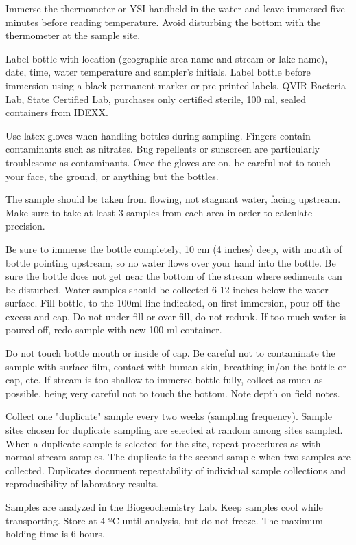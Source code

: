 \documentclass[12pt]{../SOP4_alpha}\usepackage[]{graphicx}\usepackage[]{xcolor}
\begin{document}
\NP Immerse the thermometer or YSI handheld in the water and leave immersed
five minutes before reading temperature. Avoid disturbing the bottom with
the thermometer at the sample site.

\NP Label bottle with location (geographic area name and stream or lake name),
date, time, water temperature and sampler's initials. Label bottle before
immersion using a black permanent marker or pre-printed labels. QVIR
Bacteria Lab, State Certified Lab, purchases only certified sterile, 100 ml,
sealed containers from IDEXX.

\NP Use latex gloves when handling bottles during sampling. Fingers contain
contaminants such as nitrates. Bug repellents or sunscreen are particularly troublesome as contaminants. Once the gloves are on, be careful not to touch
your face, the ground, or anything but the bottles.

\NP The sample should be taken from flowing, not stagnant water, facing
upstream. Make sure to take at least 3 samples from each area in order to calculate precision.

\NP Be sure to immerse the bottle completely, 10 cm (4 inches) deep, with
mouth of bottle pointing upstream, so no water flows over your hand into the
bottle. Be sure the bottle does not get near the bottom of the stream where
sediments can be disturbed. Water samples should be collected 6-12 inches
below the water surface. Fill bottle, to the 100ml line indicated, on first
immersion, pour off the excess and cap. Do not under fill or over fill, do not
redunk. If too much water is poured off, redo sample with new 100 ml
container.

\NP Do not touch bottle mouth or inside of cap. Be careful not to
contaminate the sample with surface film, contact with human skin, breathing
in/on the bottle or cap, etc. If stream is too shallow to immerse bottle fully,
collect as much as possible, being very careful not to touch the bottom. Note
depth on field notes.

\NP Collect one "duplicate" sample every two weeks (sampling frequency).
Sample sites chosen for duplicate sampling are selected at random among
sites sampled. When a duplicate sample is selected for the site, repeat
procedures as with normal stream samples. The duplicate is the second
sample when two samples are collected. Duplicates document repeatability of
individual sample collections and reproducibility of laboratory results.

\NP Samples are analyzed in the Biogeochemistry Lab. Keep samples cool
while transporting. Store at 4 ºC until analysis, but do not freeze. The
maximum holding time is 6 hours.
\end{document}
